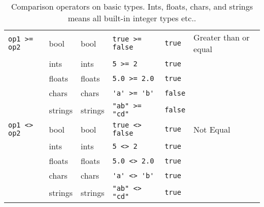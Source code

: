 \begin{table}
\begin{tabularx}{\linewidth}{|l|l|l|l|l|X|}
    \hline
    \lstinline!op1 >= op2!&bool & bool & \lstinline!true >= false!&\lstinline!true!&Greater than or equal\\
             &ints & ints & \lstinline!5 >= 2!&\lstinline!true!&\\
             &floats & floats & \lstinline!5.0 >= 2.0!&\lstinline!true!&\\
             &chars & chars & \lstinline!'a' >= 'b'!&\lstinline!false!&\\
             &strings & strings & \lstinline!"ab" >= "cd"!&\lstinline!false!&\\
    \hline
    \lstinline!op1 <> op2!&bool & bool & \lstinline!true <> false!&\lstinline!true!&Not Equal\\
             &ints & ints & \lstinline!5 <> 2!&\lstinline!true!&\\
             &floats & floats & \lstinline!5.0 <> 2.0!&\lstinline!true!&\\
             &chars & chars & \lstinline!'a' <> 'b'!&\lstinline!true!&\\
             &strings & strings & \lstinline!"ab" <> "cd"!&\lstinline!true!&\\
    \hline
  \end{tabularx}
  \caption{Comparison operators on basic types. Ints, floats, chars, and strings means all built-in integer types etc..}
  \label{tab:comparisonOperators}
\end{table}

